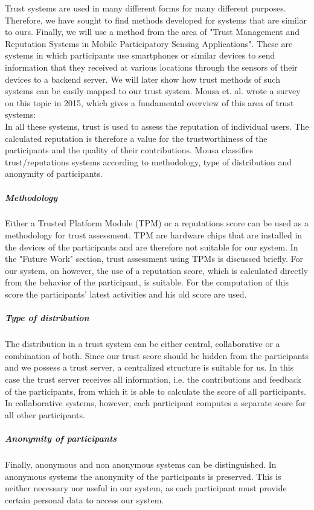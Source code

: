 \documentclass[
a4paper,     %
titlepage,   %
14pt         %
]{scrartcl}  %
\theoremstyle{mystyle}
\begin{document}
Trust systems are used in many different forms for many different purposes. Therefore, we have sought to find methods developed for systems that are similar to ours. Finally, we will use a method from the area of "Trust Management and Reputation Systems in Mobile Participatory Sensing Applications". These are systems in which participants use smartphones or similar devices to send information that they received at various locations through the sensors of their devices to a backend server. We will later show how trust methods of such systems can be easily mapped to our trust system. Mousa et. al. wrote a survey on this topic in 2015, which gives a fundamental overview of this area of trust systems\cite{mousa2015trust}:\\

In all these systems, trust is used to assess the reputation of individual users. The calculated reputation is therefore a value for the trustworthiness of the participants and the quality of their contributions. Mousa classifies trust/reputations systems according to methodology, type of distribution and anonymity of participants. 

\subparagraph{Methodology} Either a Trusted Platform Module (TPM) or a reputations score can be used as a methodology for trust assessment. TPM are hardware chips that are installed in the devices of the participants and are therefore not suitable for our system. In the "Future Work" section, trust assessment using TPMs is discussed briefly. For our system, on however, the use of a reputation score, which is calculated directly from the behavior of the participant, is suitable. For the computation of this score the participants' latest activities and his old score are used.

\subparagraph{Type of distribution} The distribution in a trust system can be either central, collaborative or a combination of both. Since our trust score should be hidden from the participants and we possess a trust server, a centralized structure is suitable for us. In this case the trust server receives all information, i.e. the contributions and feedback of the participants, from which it is able to calculate the score of all participants. In collaborative systems, however, each participant computes a separate score for all other participants.

\subparagraph{Anonymity of participants} Finally, anonymous and non anonymous systems can be distinguished. In anonymous systems the anonymity of the participants is preserved. This is neither necessary nor useful in our system, as each participant must provide certain personal data to access our system. \\
\end{document}
